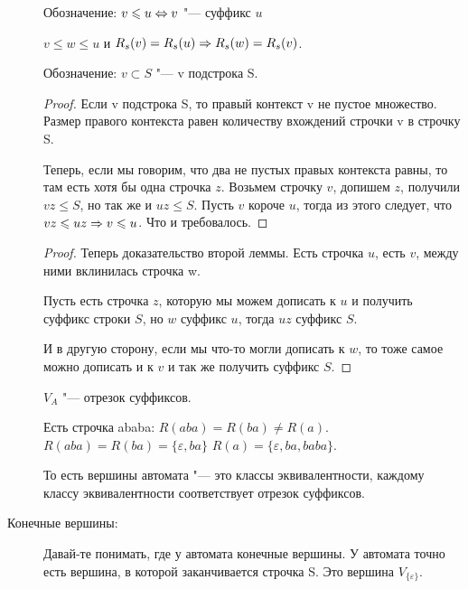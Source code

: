 \begin{description}
    \begin{Def}
    Обозначение: $v \leqslant u \Leftrightarrow v$ "--- суффикс $u$
    \end{Def}

    \begin{lemma}
    $v \le w \le u$ и $R_s(v) = R_s(u) \Rightarrow R_s(w) = R_s(v)$.
    \end{lemma}
    
    \begin{Def}
    Обозначение: $v \subset S$ "--- v подстрока S. 
    \end{Def}

    \begin{proof}
    Если v подстрока S, то правый контекст v не пустое множество. Размер правого контекста равен количеству 
    вхождений строчки v в строчку S. 

    Теперь, если мы говорим, что два не пустых правых контекста равны, то там есть хотя бы одна строчка $z$.
    Возьмем строчку $v$, допишем $z$, получили $vz \le S$, но так же и $uz \le S$. Пусть $v$ короче $u$, тогда
    из этого следует, что $vz \leqslant uz \Rightarrow v \leqslant u$. Что и требовалось.
    \end{proof}
    \begin{proof}
    Теперь доказательство второй леммы. Есть строчка $u$, есть $v$, между ними вклинилась строчка w. 

    Пусть есть строчка $z$, которую мы можем дописать к $u$ и получить суффикс строки $S$, но $w$ суффикс $u$, тогда $uz$  суффикс $S$.

    И в другую сторону, если мы что-то могли дописать к $w$, то тоже самое можно дописать и к $v$ и так же получить суффикс $S$.
    \end{proof}
    
    \begin{lemma}
    $V_A$ "--- отрезок суффиксов.
    \end{lemma}
    \begin{exmp}
    Есть строчка ababa:
    $R(aba) = R(ba) \ne R(a)$.
    $R(aba) = R(ba) = \{\varepsilon, ba\}$
    $R(a) = \{\varepsilon, ba, baba\}$.
    \end{exmp}

    То есть вершины автомата "--- это классы эквивалентности, каждому классу 
    эквивалентности соответствует отрезок суффиксов. 
    
    \item[Конечные вершины:]
    Давай-те понимать, где у автомата конечные вершины. У автомата точно есть 
    вершина, в которой заканчивается строчка S. Это вершина $V_{\{\varepsilon\}}$.


\end{description}
